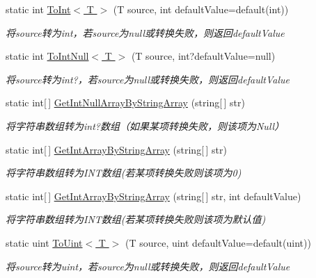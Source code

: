 \begin{DoxyCompactItemize}
static int \hyperlink{class_x_c_l_net_tools_1_1_common_1_1_data_type_convert_a0153e442c6d2a0ba381bf25dfef5cfb2}{To\+Int$<$ T $>$} (T source, int default\+Value=default(int))
\begin{DoxyCompactList}\small\item\em 将source转为int，若source为null或转换失败，则返回default\+Value \end{DoxyCompactList}\item 
static int \hyperlink{class_x_c_l_net_tools_1_1_common_1_1_data_type_convert_a58891c27d77c7a6aa44766167b64b4ce}{To\+Int\+Null$<$ T $>$} (T source, int?default\+Value=null)
\begin{DoxyCompactList}\small\item\em 将source转为int?，若source为null或转换失败，则返回default\+Value \end{DoxyCompactList}\item 
static int\mbox{[}$\,$\mbox{]} \hyperlink{class_x_c_l_net_tools_1_1_common_1_1_data_type_convert_ac3f26d844001e5094f02dc70ed10c3f5}{Get\+Int\+Null\+Array\+By\+String\+Array} (string\mbox{[}$\,$\mbox{]} str)
\begin{DoxyCompactList}\small\item\em 将字符串数组转为int?数组（如果某项转换失败，则该项为\+Null） \end{DoxyCompactList}\item 
static int\mbox{[}$\,$\mbox{]} \hyperlink{class_x_c_l_net_tools_1_1_common_1_1_data_type_convert_a4989f3ee0b2b95175ce7229c8e75a68a}{Get\+Int\+Array\+By\+String\+Array} (string\mbox{[}$\,$\mbox{]} str)
\begin{DoxyCompactList}\small\item\em 将字符串数组转为\+I\+N\+T数组(若某项转换失败则该项为0) \end{DoxyCompactList}\item 
static int\mbox{[}$\,$\mbox{]} \hyperlink{class_x_c_l_net_tools_1_1_common_1_1_data_type_convert_ae22c68e54a576fc1093ca3555789331c}{Get\+Int\+Array\+By\+String\+Array} (string\mbox{[}$\,$\mbox{]} str, int default\+Value)
\begin{DoxyCompactList}\small\item\em 将字符串数组转为\+I\+N\+T数组(若某项转换失败则该项为默认值) \end{DoxyCompactList}\item 
static uint \hyperlink{class_x_c_l_net_tools_1_1_common_1_1_data_type_convert_af6d9ff6103f191d91f38cfda562c25aa}{To\+Uint$<$ T $>$} (T source, uint default\+Value=default(uint))
\begin{DoxyCompactList}\small\item\em 将source转为uint，若source为null或转换失败，则返回default\+Value \end{DoxyCompactList}\item 

\end{DoxyCompactItemize}
